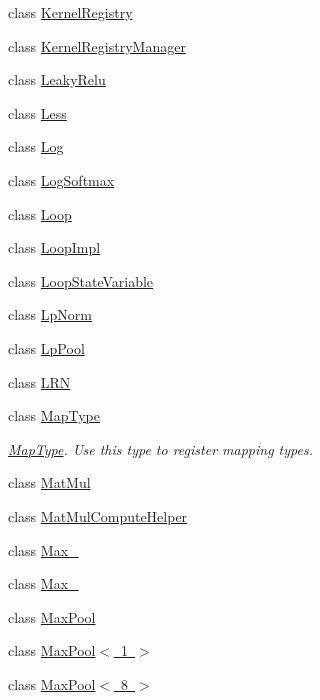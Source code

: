 \begin{DoxyCompactItemize}
class \mbox{\hyperlink{classonnxruntime_1_1KernelRegistry}{Kernel\+Registry}}
\item 
class \mbox{\hyperlink{classonnxruntime_1_1KernelRegistryManager}{Kernel\+Registry\+Manager}}
\item 
class \mbox{\hyperlink{classonnxruntime_1_1LeakyRelu}{Leaky\+Relu}}
\item 
class \mbox{\hyperlink{classonnxruntime_1_1Less}{Less}}
\item 
class \mbox{\hyperlink{classonnxruntime_1_1Log}{Log}}
\item 
class \mbox{\hyperlink{classonnxruntime_1_1LogSoftmax}{Log\+Softmax}}
\item 
class \mbox{\hyperlink{classonnxruntime_1_1Loop}{Loop}}
\item 
class \mbox{\hyperlink{classonnxruntime_1_1LoopImpl}{Loop\+Impl}}
\item 
class \mbox{\hyperlink{classonnxruntime_1_1LoopStateVariable}{Loop\+State\+Variable}}
\item 
class \mbox{\hyperlink{classonnxruntime_1_1LpNorm}{Lp\+Norm}}
\item 
class \mbox{\hyperlink{classonnxruntime_1_1LpPool}{Lp\+Pool}}
\item 
class \mbox{\hyperlink{classonnxruntime_1_1LRN}{L\+RN}}
\item 
class \mbox{\hyperlink{classonnxruntime_1_1MapType}{Map\+Type}}
\begin{DoxyCompactList}\small\item\em \mbox{\hyperlink{classonnxruntime_1_1MapType}{Map\+Type}}. Use this type to register mapping types. \end{DoxyCompactList}\item 
class \mbox{\hyperlink{classonnxruntime_1_1MatMul}{Mat\+Mul}}
\item 
class \mbox{\hyperlink{classonnxruntime_1_1MatMulComputeHelper}{Mat\+Mul\+Compute\+Helper}}
\item 
class \mbox{\hyperlink{classonnxruntime_1_1Max__6}{Max\+\_}}
\item 
class \mbox{\hyperlink{classonnxruntime_1_1Max__8}{Max\+\_}}
\item 
class \mbox{\hyperlink{classonnxruntime_1_1MaxPool}{Max\+Pool}}
\item 
class \mbox{\hyperlink{classonnxruntime_1_1MaxPool_3_011_01_4}{Max\+Pool$<$ 1 $>$}}
\item 
class \mbox{\hyperlink{classonnxruntime_1_1MaxPool_3_018_01_4}{Max\+Pool$<$ 8 $>$}}
\item 

\end{DoxyCompactItemize}
